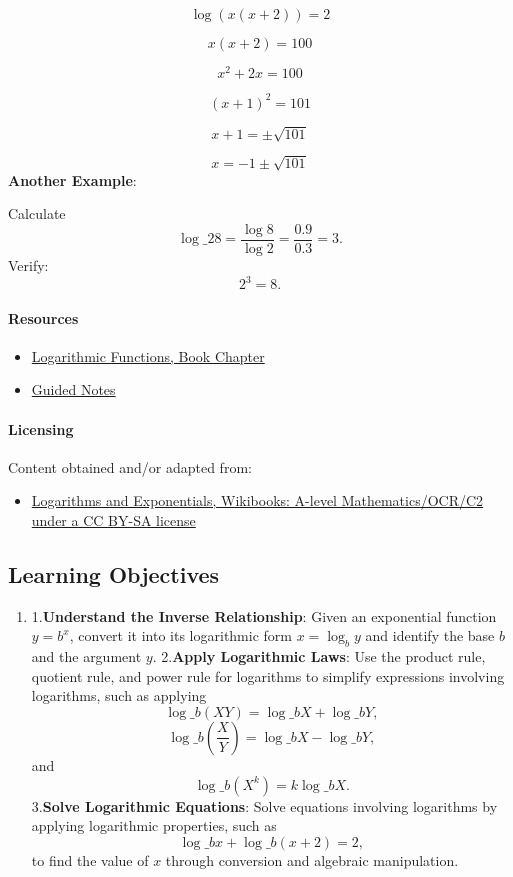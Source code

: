 $$
\log (x(x+2)) = 2
$$

$$
x(x+2) = 100
$$

$$
x^2 + 2x = 100
$$

$$
(x+1)^2 = 101
$$

$$
x+1 = \pm \sqrt{101}
$$

$$
x = -1 \pm \sqrt{101}
$$
\textbf{Another Example}:

Calculate
$$
\log\_2 8 = \frac{\log 8}{\log 2} = \frac{0.9}{0.3} = 3.
$$
Verify:
$$
2^3 = 8.
$$
\paragraph{Resources}

\begin{itemize}
    \item \href{https://mathresearch.utsa.edu/wikiFiles/MAT1053/Logarithmic_Functions/MAT1053_M5.2Logarithmic_Functions.pdf}{Logarithmic Functions, Book Chapter}
    \item \href{https://mathresearch.utsa.edu/wikiFiles/MAT1053/Logarithmic_Functions/MAT1053_M5.2Logarithmic_FunctionsGN.pdf}{Guided Notes}
\end{itemize}

\paragraph{Licensing}

Content obtained and/or adapted from:

\begin{itemize}
    \item \href{https://en.wikibooks.org/wiki/A-level_Mathematics/OCR/C2/Logarithms_and_Exponentials}{Logarithms and Exponentials, Wikibooks: A-level Mathematics/OCR/C2 under a CC BY-SA license}
\end{itemize}

\subsection{Learning Objectives}

\begin{enumerate}
    \item 1.\textbf{Understand the Inverse Relationship}: Given an exponential function $y = b^x$, convert it into its logarithmic form $x = \log_b y$ and identify the base $b$ and the argument $y$. 2.\textbf{Apply Logarithmic Laws}: Use the product rule, quotient rule, and power rule for logarithms to simplify expressions involving logarithms, such as applying $$ \log\_b (XY) = \log\_b X + \log\_b Y, $$ $$ \log\_b \left(\frac{X}{Y}\right) = \log\_b X - \log\_b Y, $$ and $$ \log\_b (X^k) = k \log\_b X. $$ 3.\textbf{Solve Logarithmic Equations}: Solve equations involving logarithms by applying logarithmic properties, such as $$ \log\_b x + \log\_b (x + 2) = 2, $$ to find the value of $x$ through conversion and algebraic manipulation.
\end{enumerate}

